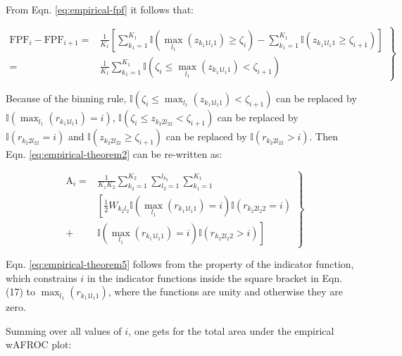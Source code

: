 \documentclass[
]{book}
\begin{document}
From Eqn. \eqref{eq:empirical-fpf} it follows that:

\begin{equation}
\left. 
\begin{aligned}
\text{FPF}_i - \text{FPF}_{i+1}=& \frac{1}{K_1} \left[ \sum_{k_1=1}^{K_1} \mathbb{I}\left ( \max_{l_1} \left (z_{k_1 1 l_1 1}  \right ) \geq \zeta_i \right ) - \sum_{k_1=1}^{K_1} \mathbb{I}\left ( z_{k_1 1 l_1 1} \geq \zeta_{i+1} \right ) \right] \\
=& \frac{1}{K_1} \sum_{k_1=1}^{K_1} \mathbb{I}\left ( \zeta_i \leq \max_{l_1} \left (z_{k_1 1 l_1 1}  \right ) < \zeta_{i+1} \right ) 
\end{aligned}
\right \} 
\label{eq:empirical-theorem4}
\end{equation}

Because of the binning rule, \(\mathbb{I}\left ( \zeta_i \leq \max_{l_1} \left (z_{k_1 1 l_1 1} \right ) < \zeta_{i+1} \right )\) can be replaced by \(\mathbb{I}\left ( \max_{l_1} \left (r_{k_1 1 l_1 1} \right ) = i \right )\), \(\mathbb{I}\left ( \zeta_i \leq z_{k_2 2l_22} < \zeta_{i+1} \right )\) can be replaced by \(\mathbb{I}\left ( r_{k_2 2l_22} = i \right )\) and \(\mathbb{I}\left (z_{k_2 2l_22} \geq \zeta_{i+1} \right )\) can be replaced by \(\mathbb{I}\left (r_{k_2 2l_22} > i \right )\). Then Eqn. \eqref{eq:empirical-theorem2} can be re-written as:

\begin{equation}
\left. 
\begin{aligned}
\text{A}_i =& \frac{1}{K_1K_2}  \sum_{k_2=1}^{K_2} \sum_{l_2=1}^{l_{k_2}}\sum_{k_1=1}^{K_1} \\
&\left [ \frac{1}{2} W_{k_2l_2} \mathbb{I}\left ( \max_{l_1} \left (r_{k_1 1 l_1 1}  \right ) = i  \right )\mathbb{I}\left ( r_{k_2 2 l_2 2} = i\right ) \right. \\
+& \left. \mathbb{I}\left ( \max_{l_1} \left (r_{k_1 1 l_1 1}  \right ) = i  \right )\mathbb{I}\left ( r_{k_2 2 l_2 2} > i \right )  \right ]
\end{aligned}
\right \} 
\label{eq:empirical-theorem5}
\end{equation}

Eqn. \eqref{eq:empirical-theorem5} follows from the property of the indicator function, which constrains \(i\) in the indicator functions inside the square bracket in Eqn. (17) to \(\max_{l_1} \left ( r_{k_1 1 l_1 1} \right )\), where the functions are unity and otherwise they are zero.

Summing over all values of \(i\), one gets for the total area under the empirical wAFROC plot:
\end{document}
